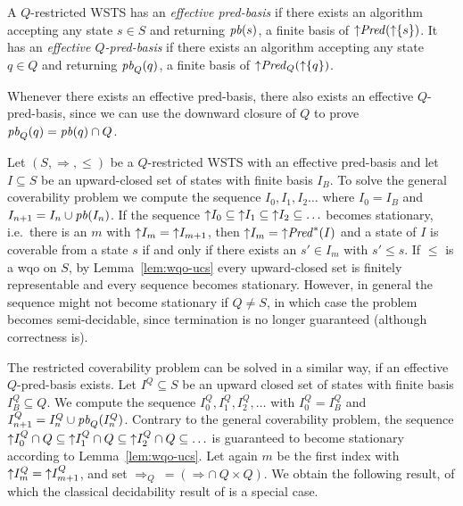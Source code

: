 \documentclass{llncs}
\newcommand{\predBasis}[2][]{\ensuremath{\mathit{pb}\ifthenelse{\equal{#1}{}}{}{_{#1}}(#2)}}
\newcommand{\pred}[2][]{\ensuremath{\mathit{Pred}\ifthenelse{\equal{#1}{}}{}{_{#1}}(#2)}}
\newcommand{\predAll}[1]{\ensuremath{\mathit{Pred}^*(#1)}}
\begin{document}
\begin{definition}
  \label{def:effective-pred-basis}
  A $Q$-restricted WSTS has an \emph{effective pred-basis} if there exists an
  algorithm accepting any state $s \in S$ and returning
  $\predBasis{s}$, a finite basis of $\upclosed{\pred{\upclosed{\{s\}}}}$.
  It has an \emph{effective $Q$-pred-basis} if there exists an algorithm 
  accepting any state $q \in Q$ and returning $\predBasis[Q]{q}$, a finite 
  basis of $\upclosed{\pred[Q]{\upclosed{\{q\}}}}$.
\end{definition}

Whenever there exists an effective pred-basis, there also exists an
effective $Q$-pred-basis, since we can use the downward closure of
$Q$ to prove $\predBasis[Q]{q} = \predBasis{q} \cap Q$. 

Let $(S, \Rightarrow, \leq)$ be a $Q$-restricted WSTS with an effective 
pred-basis and let $I \subseteq S$ be an upward-closed set of states with 
finite basis $I_B$. To solve the general coverability problem we compute the 
sequence $I_0, I_1, I_2 \ldots$ where $I_0 = I_B$ and $I_{n+1} = I_n \cup 
\predBasis{I_n}$. If the sequence $\mathord{\uparrow} I_0 \subseteq \mathord{\uparrow} I_1 
\subseteq \mathord{\uparrow} I_2 \subseteq \ldots$ becomes stationary, i.e.~there is an 
$m$ with $\mathord{\uparrow} I_m = \mathord{\uparrow} I_{m+1}$, then $\upclosed{I_m} = 
\upclosed{\predAll{I}}$ and a state of $I$ is coverable from a state $s$ if and 
only if there exists an $s' \in I_m$ with $s' \leq s$. If $\leq$ is a wqo on 
$S$, by Lemma~\ref{lem:wqo-ucs} every upward-closed set is finitely 
representable and every sequence becomes stationary. However, in general the 
sequence might not become stationary if $Q \neq S$, in which case the problem 
becomes semi-decidable, since termination is no longer guaranteed (although 
correctness is).

The restricted coverability problem can be solved in a similar way, if
an effective $Q$-pred-basis exists. Let $I^Q \subseteq S$ be an upward
closed set of states with finite basis $I^Q_B \subseteq Q$. We
compute the sequence $I^Q_0, I^Q_1, I^Q_2, \ldots$ with $I^Q_0 =
I^Q_B$ and $I^Q_{n+1} = I^Q_n \cup \predBasis[Q]{I^Q_n}$. Contrary to
the general coverability problem, the sequence $\mathord{\uparrow} I^Q_0 \cap
Q \subseteq \mathord{\uparrow} I^Q_1 \cap Q \subseteq \mathord{\uparrow} I^Q_2 \cap Q
\subseteq \ldots$ is guaranteed to become stationary according to
Lemma~\ref{lem:wqo-ucs}. Let again $m$ be the first index with
$\mathord{\uparrow} I^Q_m = \mathord{\uparrow} I^Q_{m+1}$, and set $\Rightarrow_Q\ = 
(\Rightarrow \cap\ Q \times Q)$.
We obtain the following result, of which the classical decidability
result of \cite{fs:well-structured-everywhere} is a special case.
\end{document}
